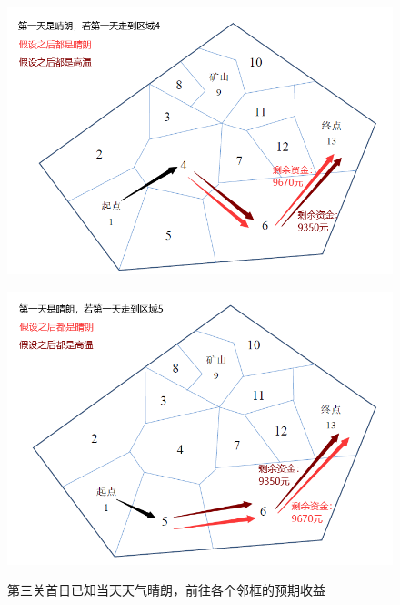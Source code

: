\documentclass[withoutpreface,bwprint]{cumcmthesis} %
\begin{document}
\begin{figure}
    \centering
    \begin{minipage}[c]{0.45\textwidth}
        \centering
        \includegraphics[width=.95\textwidth]{figures/gate3-2.png}
        \label{gate3-2}
    \end{minipage}
    \begin{minipage}[c]{0.45\textwidth}
        \centering
        \includegraphics[width=.95\textwidth]{figures/gate3-3.png}
        \label{gate3-3}
    \end{minipage}
    \caption{第三关首日已知当天天气晴朗，前往各个邻框的预期收益}
    \label{q2}
\end{figure}
\end{document}
